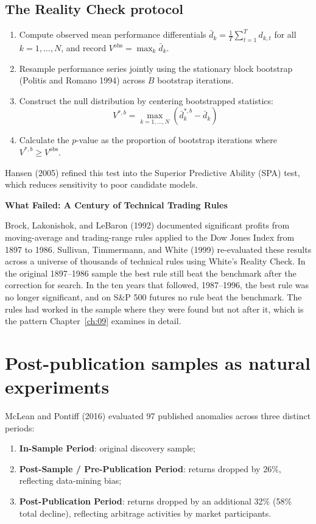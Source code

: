 \subsection{The Reality Check protocol}
\begin{enumerate}
  \item Compute observed mean performance differentials $\bar{d}_k = \frac{1}{T} \sum_{t=1}^T d_{k,t}$ for all $k = 1, \dots, N$, and record $V^{\text{obs}} = \max_k \bar{d}_k$.
  \item Resample performance series jointly using the stationary block bootstrap (Politis and Romano 1994) across $B$ bootstrap iterations.
  \item Construct the null distribution by centering bootstrapped statistics:
  \begin{equation}
    V^{*,b} = \max_{k=1, \dots, N} \left( \bar{d}_{k}^{*,b} - \bar{d}_k \right)
  \end{equation}
  \item Calculate the $p$-value as the proportion of bootstrap iterations where $V^{*,b} \ge V^{\text{obs}}$.
\end{enumerate}
Hansen (2005) refined this test into the Superior Predictive Ability (SPA) test, which reduces sensitivity to poor candidate models.

\begin{callout}
\noindent \textbf{What Failed: A Century of Technical Trading Rules}

Brock, Lakonishok, and LeBaron (1992) documented significant profits from moving-average and trading-range rules applied to the Dow Jones Index from 1897 to 1986. Sullivan, Timmermann, and White (1999) re-evaluated these results across a universe of thousands of technical rules using White's Reality Check. In the original 1897--1986 sample the best rule still beat the benchmark after the correction for search. In the ten years that followed, 1987--1996, the best rule was no longer significant, and on S\&P 500 futures no rule beat the benchmark. The rules had worked in the sample where they were found but not after it, which is the pattern Chapter~\ref{ch:09} examines in detail.
\end{callout}

\section{Post-publication samples as natural experiments}
\label{sec:08-postpub}

McLean and Pontiff (2016) evaluated 97 published anomalies across three distinct periods:
\begin{enumerate}
  \item \textbf{In-Sample Period}: original discovery sample;
  \item \textbf{Post-Sample / Pre-Publication Period}: returns dropped by 26\%, reflecting data-mining bias;
  \item \textbf{Post-Publication Period}: returns dropped by an additional 32\% (58\% total decline), reflecting arbitrage activities by market participants.
\end{enumerate}

